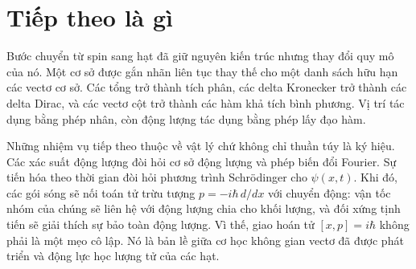 \section{Tiếp theo là gì}

Bước chuyển từ spin sang hạt đã giữ nguyên kiến trúc nhưng thay đổi quy mô của nó. Một cơ sở được gắn nhãn liên tục thay thế cho một danh sách hữu hạn các vectơ cơ sở. Các tổng trở thành tích phân, các delta Kronecker trở thành các delta Dirac, và các vectơ cột trở thành các hàm khả tích bình phương. Vị trí tác dụng bằng phép nhân, còn động lượng tác dụng bằng phép lấy đạo hàm.

Những nhiệm vụ tiếp theo thuộc về vật lý chứ không chỉ thuần túy là ký hiệu. Các xác suất động lượng đòi hỏi cơ sở động lượng và phép biến đổi Fourier. Sự tiến hóa theo thời gian đòi hỏi phương trình Schr\"odinger cho \(\psi(x,t)\). Khi đó, các gói sóng sẽ nối toán tử trừu tượng \(p=-i\hbar\,d/dx\) với chuyển động: vận tốc nhóm của chúng sẽ liên hệ với động lượng chia cho khối lượng, và đối xứng tịnh tiến sẽ giải thích sự bảo toàn động lượng. Vì thế, giao hoán tử \([x,p]=i\hbar\) không phải là một mẹo cô lập. Nó là bản lề giữa cơ học không gian vectơ đã được phát triển và động lực học lượng tử của các hạt.
